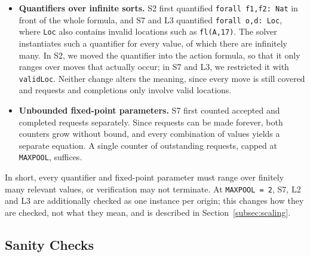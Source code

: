 \begin{itemize}
  \item \textbf{Quantifiers over infinite sorts.} S2 first quantified \texttt{forall f1,f2: Nat} in front of the whole formula, and S7 and L3 quantified \texttt{forall o,d: Loc}, where \texttt{Loc} also contains invalid locations such as \texttt{fl(A,17)}. The solver instantiates such a quantifier for every value, of which there are infinitely many. In S2, we moved the quantifier into the action formula, so that it only ranges over moves that actually occur; in S7 and L3, we restricted it with \texttt{validLoc}. Neither change alters the meaning, since every move is still covered and requests and completions only involve valid locations.
  \item \textbf{Unbounded fixed-point parameters.} S7 first counted accepted and completed requests separately. Since requests can be made forever, both counters grow without bound, and every combination of values yields a separate equation. A single counter of outstanding requests, capped at \texttt{MAXPOOL}, suffices.
\end{itemize}

In short, every quantifier and fixed-point parameter must range over finitely many relevant values, or verification may not terminate. At \texttt{MAXPOOL = 2}, S7, L2 and L3 are additionally checked as one instance per origin; this changes how they are checked, not what they mean, and is described in Section~\ref{subsec:scaling}.


\subsection{Sanity Checks}
\label{subsec:sanity-checks}

